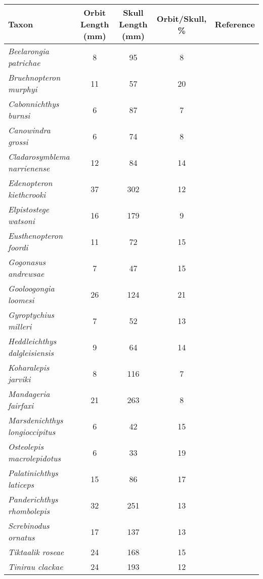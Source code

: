 \begin{tabular}{|L{4.5cm}|c|c|c|L{4.5cm}|}
\hline
\textbf{Taxon}&\textbf{Orbit Length (mm)}&\textbf{Skull Length (mm)}&\textbf{Orbit/Skull, \%}&\textbf{Reference}\\\hline
\textit{Beelarongia patrichae}&8&95&8 &\cite{Long87a}\\\hline
\textit{Bruehnopteron  murphyi}&11&57&20&\cite{Schu12a}\\\hline
\textit{Cabonnichthys burnsi}&6&87&7 &\cite{Ahlb97a}\\\hline
\textit{Canowindra grossi}&6&74&8 &\cite{Long85a}\\\hline
\textit{Cladarosymblema narrienense}&12&84&14&\cite{Fox95a}\\\hline
\textit{Edenopteron kiethcrooki}&37&302&12&\cite{Youn13a}\\\hline
\textit{Elpistostege watsoni}&16&179&9 &\cite{Schu85a}\\\hline
\textit{Eusthenopteron foordi}&11&72&15&\cite{Mark07a}\\\hline
\textit{Gogonasus andrewsae}&7&47&15&\cite{Long06a}\\\hline
\textit{Gooloogongia loomesi}&26&124&21&\cite{Joha98a}\\\hline
\textit{Gyroptychius  milleri}&7&52&13&\cite{Newm15a}\\\hline
\textit{Heddleichthys dalgleisiensis}&9&64&14&\cite{Snit09a}\\\hline
\textit{Koharalepis jarviki}&8&116&7 &\cite{Youn92a}\\\hline
\textit{Mandageria fairfaxi}&21&263&8 &\cite{Joha97a}\\\hline
\textit{Marsdenichthys longioccipitus}&6&42&15&\cite{Holl10a}\\\hline
\textit{Osteolepis macrolepidotus}&6&33&19&\cite{Jarv48a}\\\hline
\textit{Palatinichthys laticeps}&15&86&17&\cite{Witz12a}\\\hline
\textit{Panderichthys rhombolepis}&32&251&13&\cite{Voro91a}\\\hline
\textit{Screbinodus ornatus}&17&137&13&\cite{Jeff12a}\\\hline
\textit{Tiktaalik roseae}&24&168&15&\cite{Daes06a}\\\hline
\textit{Tinirau clackae}&24&193&12&\cite{Swar12a}\\\hline
\end{tabular}
